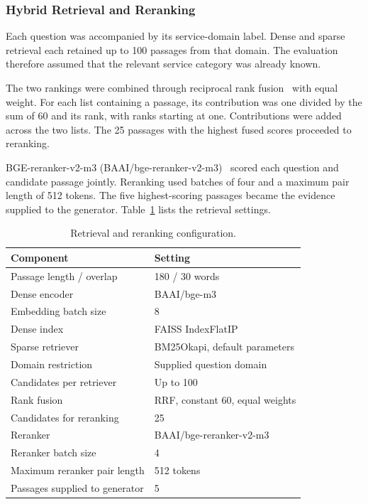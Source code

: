 \documentclass[10pt,journal,compsoc]{IEEEtran}
\begin{document}
\subsubsection{Hybrid Retrieval and Reranking}

Each question was accompanied by its service-domain label. Dense and sparse retrieval each retained up to 100 passages from that domain. The evaluation therefore assumed that the relevant service category was already known.

The two rankings were combined through reciprocal rank fusion~\cite{meth_cormack2009rrf} with equal weight. For each list containing a passage, its contribution was one divided by the sum of 60 and its rank, with ranks starting at one. Contributions were added across the two lists. The 25 passages with the highest fused scores proceeded to reranking.

BGE-reranker-v2-m3 (BAAI/bge-reranker-v2-m3)~\cite{baai2024reranker} scored each question and candidate passage jointly. Reranking used batches of four and a maximum pair length of 512 tokens. The five highest-scoring passages became the evidence supplied to the generator. Table~\ref{tab:retrieval_settings} lists the retrieval settings.

\begin{table}[!t]
\centering
\caption{Retrieval and reranking configuration.}
\label{tab:retrieval_settings}
\footnotesize
\setlength{\tabcolsep}{3pt}
\renewcommand{\arraystretch}{1.1}
\begin{tabular}{p{}p{}}
\hline
\textbf{Component} & \textbf{Setting} \\
\hline
Passage length / overlap & 180 / 30 words \\
Dense encoder & BAAI/bge-m3 \\
Embedding batch size & 8 \\
Dense index & FAISS IndexFlatIP \\
Sparse retriever & BM25Okapi, default parameters \\
Domain restriction & Supplied question domain \\
Candidates per retriever & Up to 100 \\
Rank fusion & RRF, constant 60, equal weights \\
Candidates for reranking & 25 \\
Reranker & BAAI/bge-reranker-v2-m3 \\
Reranker batch size & 4 \\
Maximum reranker pair length & 512 tokens \\
Passages supplied to generator & 5 \\
\hline
\end{tabular}
\end{table}
\end{document}
